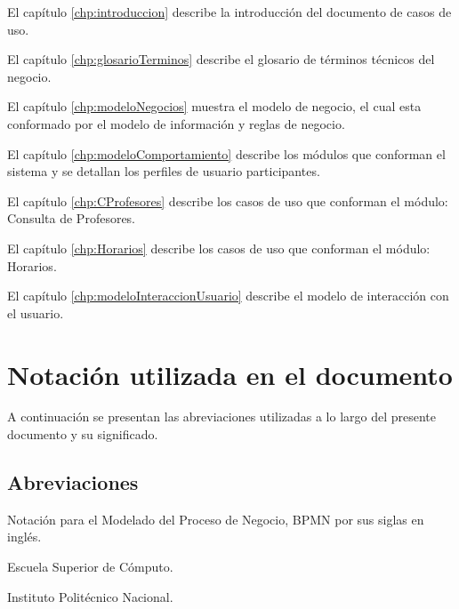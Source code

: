 \begin{Citemize}
	
	\item El capítulo \ref{chp:introduccion} describe la introducción del documento de casos de uso.
	
	\item El capítulo \ref{chp:glosarioTerminos} describe el glosario de términos técnicos del negocio.
	
	\item El capítulo \ref{chp:modeloNegocios}  muestra el modelo de negocio, el cual esta conformado por el modelo de información y reglas de negocio.
	
	\item El capítulo \ref{chp:modeloComportamiento} describe los módulos que conforman el sistema y se detallan los perfiles de usuario participantes.
	
	\item El capítulo \ref{chp:CProfesores} describe los casos de uso que conforman el módulo: Consulta de Profesores.
	
	\item El capítulo \ref{chp:Horarios} describe los casos de uso que conforman el módulo: Horarios.
	
	\item El capítulo \ref{chp:modeloInteraccionUsuario} describe el modelo de interacción con el usuario.
	
\end{Citemize}

\section{Notación utilizada en el documento}\label{sec:notacion}

A continuación se presentan las abreviaciones utilizadas a lo largo del presente documento y su significado.

\subsection{Abreviaciones}\label{ssec:abreviaciones}

\begin{description}

	 Notación para el Modelado del Proceso de Negocio, BPMN por sus siglas en inglés.
	
	 Escuela Superior de Cómputo. 
	
	 Instituto Politécnico Nacional.

\end{description}

